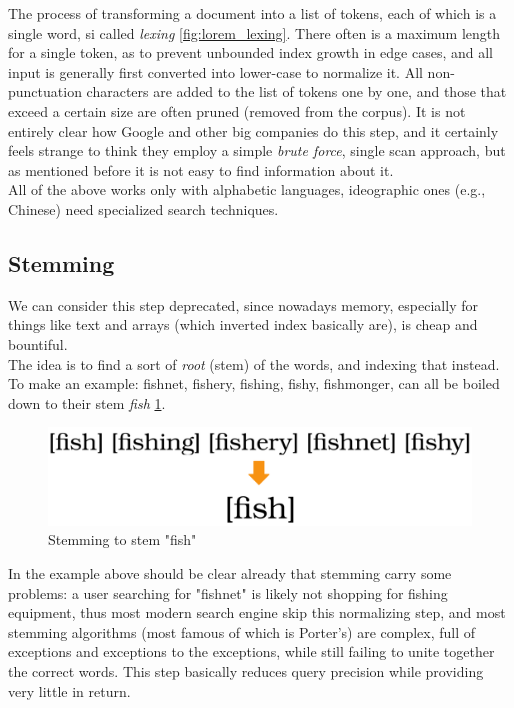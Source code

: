 The process of transforming a document into a list of tokens, each of which is a single word, si called \textit{lexing} \ref{fig:lorem_lexing}. There often is a maximum length for a single token, as to prevent unbounded index growth in edge cases, and all input is generally first converted into lower-case to normalize it. All non-punctuation characters are added to the list of tokens one by one, and those that exceed a certain size are often pruned (removed from the corpus). It is not entirely clear how Google and other big companies do this step, and it certainly feels strange to think they employ a simple \textit{brute force}, single scan approach, but as mentioned before it is not easy to find information about it. \\
All of the above works only with alphabetic languages, ideographic ones (e.g., Chinese) need specialized search techniques. 

\subsection{Stemming}

We can consider this step deprecated, since nowadays memory, especially for things like text and arrays (which inverted index basically are), is cheap and bountiful. \\
The idea is to find a sort of \textit{root} (stem) of the words, and indexing that instead. To make an example: fishnet, fishery, fishing, fishy, fishmonger, can all be boiled down to their stem \textit{fish} \ref{fig:fishstem}. 

\begin{figure}[ht] 
\begin{center}
\includegraphics[width=.8\textwidth]{imgs/stemming.png}
\caption{Stemming to stem "fish"\label{fig:fishstem}}
\end{center}
\end{figure}

In the example above should be clear already that stemming carry some problems: a user searching for "fishnet" is likely not shopping for fishing equipment, thus most modern search engine skip this normalizing step, and most stemming algorithms (most famous of which is Porter's) are complex, full of exceptions and exceptions to the exceptions, while still failing to unite together the correct words. This step basically reduces query precision while providing very little in return.

